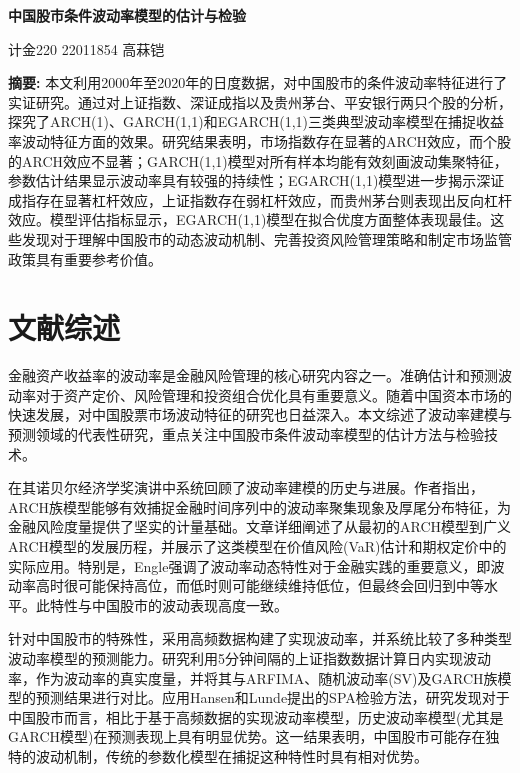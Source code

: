 \documentclass[12pt, a4paper]{article}
\begin{document}
\begin{center}
\LARGE\textbf{中国股市条件波动率模型的估计与检验}

\vspace{1cm}
\large 计金220 22011854 高菻铠
\end{center}

\noindent \textbf{摘要:} 本文利用2000年至2020年的日度数据，对中国股市的条件波动率特征进行了实证研究。通过对上证指数、深证成指以及贵州茅台、平安银行两只个股的分析，探究了ARCH(1)、GARCH(1,1)和EGARCH(1,1)三类典型波动率模型在捕捉收益率波动特征方面的效果。研究结果表明，市场指数存在显著的ARCH效应，而个股的ARCH效应不显著；GARCH(1,1)模型对所有样本均能有效刻画波动集聚特征，参数估计结果显示波动率具有较强的持续性；EGARCH(1,1)模型进一步揭示深证成指存在显著杠杆效应，上证指数存在弱杠杆效应，而贵州茅台则表现出反向杠杆效应。模型评估指标显示，EGARCH(1,1)模型在拟合优度方面整体表现最佳。这些发现对于理解中国股市的动态波动机制、完善投资风险管理策略和制定市场监管政策具有重要参考价值。

\section{文献综述}

金融资产收益率的波动率是金融风险管理的核心研究内容之一。准确估计和预测波动率对于资产定价、风险管理和投资组合优化具有重要意义。随着中国资本市场的快速发展，对中国股票市场波动特征的研究也日益深入。本文综述了波动率建模与预测领域的代表性研究，重点关注中国股市条件波动率模型的估计方法与检验技术。

\citet{engle2004risk}在其诺贝尔经济学奖演讲中系统回顾了波动率建模的历史与进展。作者指出，ARCH族模型能够有效捕捉金融时间序列中的波动率聚集现象及厚尾分布特征，为金融风险度量提供了坚实的计量基础。文章详细阐述了从最初的ARCH模型到广义ARCH模型的发展历程，并展示了这类模型在价值风险(VaR)估计和期权定价中的实际应用。特别是，Engle强调了波动率动态特性对于金融实践的重要意义，即波动率高时很可能保持高位，而低时则可能继续维持低位，但最终会回归到中等水平。此特性与中国股市的波动表现高度一致。

针对中国股市的特殊性，\citet{wei2007volatility}采用高频数据构建了实现波动率，并系统比较了多种类型波动率模型的预测能力。研究利用5分钟间隔的上证指数数据计算日内实现波动率，作为波动率的真实度量，并将其与ARFIMA、随机波动率(SV)及GARCH族模型的预测结果进行对比。应用Hansen和Lunde提出的SPA检验方法，研究发现对于中国股市而言，相比于基于高频数据的实现波动率模型，历史波动率模型(尤其是GARCH模型)在预测表现上具有明显优势。这一结果表明，中国股市可能存在独特的波动机制，传统的参数化模型在捕捉这种特性时具有相对优势。
\end{document}
